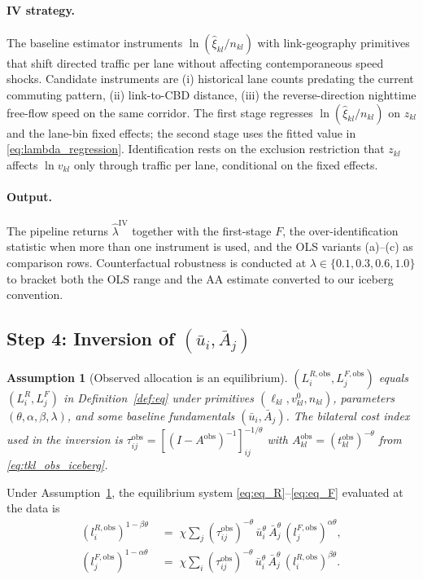 \documentclass[12pt]{article}
\newtheorem{assumption}{Assumption}
\newcommand{\ubar}{\bar u}
\newcommand{\Abar}{\bar A}
\newcommand{\tkl}{t_{kl}}
\newcommand{\tijk}{\tau_{ij}}
\newcommand{\obs}{\mathrm{obs}}
\begin{document}
\paragraph{IV strategy.}
The baseline estimator instruments $\ln(\hat\xi_{kl}/n_{kl})$ with
link-geography primitives that shift directed traffic per lane
without affecting contemporaneous speed shocks.  Candidate
instruments are
(i) historical lane counts predating the current commuting pattern,
(ii) link-to-CBD distance,
(iii) the reverse-direction nighttime free-flow speed on the same
corridor.  The first stage regresses $\ln(\hat\xi_{kl}/n_{kl})$ on
$z_{kl}$ and the lane-bin fixed effects; the second stage uses the
fitted value in \eqref{eq:lambda_regression}.  Identification rests
on the exclusion restriction that $z_{kl}$ affects $\ln v_{kl}$ only
through traffic per lane, conditional on the fixed effects.

\paragraph{Output.}
The pipeline returns $\hat\lambda^{\mathrm{IV}}$ together with the
first-stage $F$, the over-identification statistic when more than
one instrument is used, and the OLS variants (a)--(c) as
comparison rows.  Counterfactual robustness is conducted at
$\lambda\in\{0.1,0.3,0.6,1.0\}$ to bracket both the OLS range and
the AA estimate converted to our iceberg convention.

\subsection{Step 4: Inversion of $(\ubar_i,\Abar_j)$}\label{ssec:invert}

\begin{assumption}[Observed allocation is an equilibrium]
\label{ass:obs_eq}
$(L_i^{R,\obs},L_j^{F,\obs})$ equals $(L_i^R,L_j^F)$ in
Definition~\ref{def:eq} under primitives
$(\ell_{kl},v_{kl}^{0},n_{kl})$, parameters
$(\theta,\alpha,\beta,\lambda)$, and some baseline fundamentals
$(\ubar_i,\Abar_j)$.  The bilateral cost index used in the inversion
is $\tijk^{\obs}=[(I-A^{\obs})^{-1}]_{ij}^{-1/\theta}$ with
$A^{\obs}_{kl}=(\tkl^{\obs})^{-\theta}$ from \eqref{eq:tkl_obs_iceberg}.
\end{assumption}

Under Assumption~\ref{ass:obs_eq}, the equilibrium system
\eqref{eq:eq_R}--\eqref{eq:eq_F} evaluated at the data is
\begin{align}
  (l_i^{R,\obs})^{1-\beta\theta}
  &\;=\;\chi\sum_{j}(\tijk^{\obs})^{-\theta}\,\ubar_i^{\theta}\,\Abar_j^{\theta}\,
       (l_j^{F,\obs})^{\alpha\theta},
  \label{eq:invert_R}\\
  (l_j^{F,\obs})^{1-\alpha\theta}
  &\;=\;\chi\sum_{i}(\tijk^{\obs})^{-\theta}\,\ubar_i^{\theta}\,\Abar_j^{\theta}\,
       (l_i^{R,\obs})^{\beta\theta}.
  \label{eq:invert_F}
\end{align}
\end{document}

